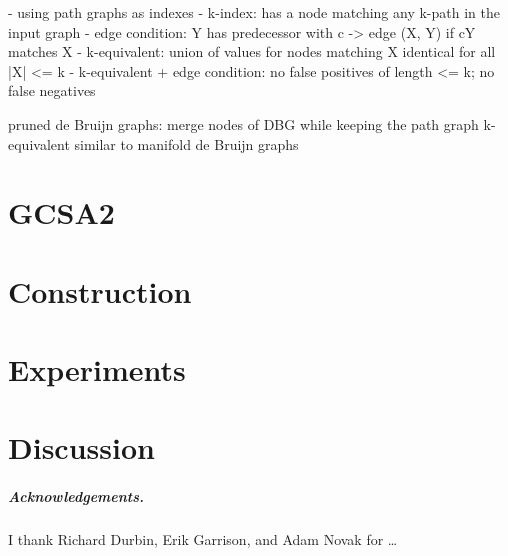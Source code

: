\documentclass[a4paper,UKenglish]{lipics-v2016}
\begin{document}
- using path graphs as indexes
- k-index: has a node matching any k-path in the input graph
- edge condition: Y has predecessor with c -> edge (X, Y) if cY matches X
- k-equivalent: union of values for nodes matching X identical for all |X| <= k
- k-equivalent + edge condition: no false positives of length <= k; no false negatives

pruned de Bruijn graphs: merge nodes of DBG while keeping the path graph k-equivalent
similar to manifold de Bruijn graphs \cite{Lin2014}


\section{GCSA2}


\section{Construction}


\section{Experiments}


\section{Discussion}


\subparagraph*{Acknowledgements.}

I thank Richard Durbin, Erik Garrison, and Adam Novak for \dots



\end{document}
